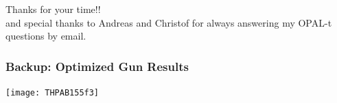 \documentclass{beamer}
\begin{document}
\begin{frame}
	\huge Thanks for your time!!\\ 
	\vskip12pt
	\large and special thanks to Andreas and Christof for always answering my OPAL-t questions by email. 
	
\end{frame}

\begin{frame}
	\frametitle{Backup: Optimized Gun Results}
	\texttt{[image: THPAB155f3]}
\end{frame}

\end{document}
